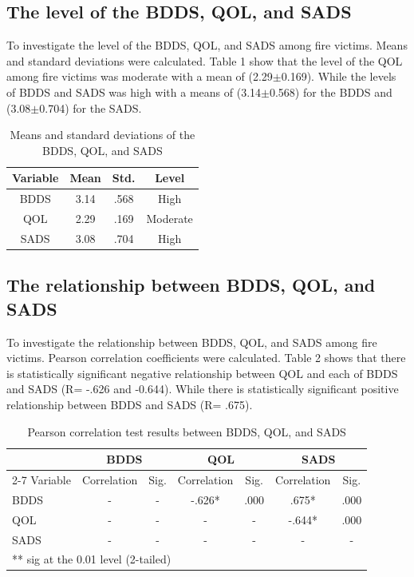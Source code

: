\documentclass[10pt]{NSP1}
\begin{document}
	\subsection{The level of the BDDS, QOL, and SADS}
	To investigate the level of the BDDS, QOL, and SADS among fire victims. Means and standard deviations were calculated. Table 1 show that the level of the QOL among fire victims was moderate with a mean of (2.29$\pm$0.169). While the levels of BDDS and SADS was high with a means of (3.14$\pm$0.568) for the BDDS and (3.08$\pm$0.704) for the SADS.
	
	\begin{table}[H]
		\centering
		\caption{Means and standard deviations of the BDDS, QOL, and SADS}
		\label{tab:descriptives}
		\vspace{5pt}
		\small
		\begin{tabular}{cccc}
			\hline
			Variable & Mean & Std. & Level \\
			\hline
			BDDS & 3.14 & .568 & High \\
			QOL & 2.29 & .169 & Moderate \\
			SADS & 3.08 & .704 & High \\
			\hline
		\end{tabular}
	\end{table}
	
	\subsection{The relationship between BDDS, QOL, and SADS}
	To investigate the relationship between BDDS, QOL, and SADS among fire victims. Pearson correlation coefficients were calculated. Table 2 shows that there is statistically significant negative relationship between QOL and each of BDDS and SADS (R= -.626 and -0.644). While there is statistically significant positive relationship between BDDS and SADS (R= .675).
	
	\begin{table}[H]
		\centering
		\caption{Pearson correlation test results between BDDS, QOL, and SADS}
		\label{tab:correlation}
		\vspace{5pt}
		\small
		\begin{tabular}{l|cc|cc|cc}
			\hline
			& \multicolumn{2}{c|}{BDDS} & \multicolumn{2}{c|}{QOL} & \multicolumn{2}{c}{SADS} \\
			\cline{2-7}
			Variable & Correlation & Sig. & Correlation & Sig. & Correlation & Sig. \\
			\hline
			BDDS & - & - & -.626* & .000 & .675* & .000 \\
			QOL & - & - & - & - & -.644* & .000 \\
			SADS & - & - & - & - & - & - \\
			\hline
			\multicolumn{7}{l}{** sig at the 0.01 level (2-tailed)} \\
		\end{tabular}
	\end{table}
	
\end{document}
